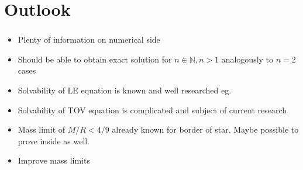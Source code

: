 \section{Outlook}

\begin{frame}
	\frametitle{\insertsection}
	\begin{itemize}[<+->]
		\item Plenty of information on numerical side
		\item Should be able to obtain exact solution for $n\in\mathbb{N}, n>1$ analogously to $n=2$ cases
		\item Solvability of LE equation is known and well researched eg. \cite{quittnerSuperlinearParabolicProblems2007a}
		\item Solvability of TOV equation is complicated and subject of current research \cite{martinsExistenceClassificationPseudoAsymptotic2019, boonsermSolutionGeneratingTheorems2007}
		\item Mass limit of $M/R<4/9$ already known for border of star. Maybe possible to prove inside as well.
		\item Improve mass limits
	\end{itemize}
\end{frame}
